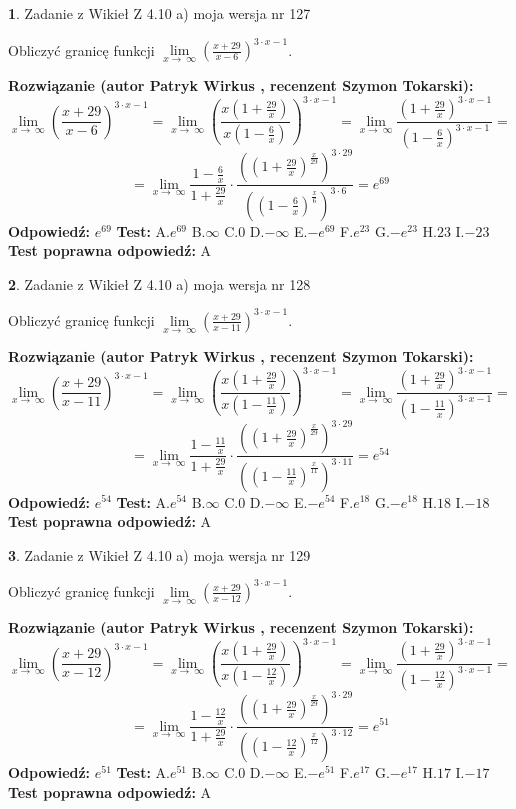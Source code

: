\documentclass[12pt, a4paper]{article}
\theoremstyle{definition} %
\newtheorem{zad}{}
\newcommand{\zadStart}[1]{\begin{zad}#1\newline}
\newcommand{\zadStop}{\end{zad}}
\newcommand{\rozwStart}[2]{\noindent \textbf{Rozwiązanie (autor #1 , recenzent #2): }\newline}
\newcommand{\rozwStop}{\newline}
\newcommand{\odpStart}{\noindent \textbf{Odpowiedź:}\newline}
\newcommand{\odpStop}{\newline}
\newcommand{\testStart}{\noindent \textbf{Test:}\newline}
\newcommand{\testStop}{\newline}
\newcommand{\kluczStart}{\noindent \textbf{Test poprawna odpowiedź:}\newline}
\newcommand{\kluczStop}{\newline}
\begin{document}
\zadStart{Zadanie z Wikieł Z 4.10 a) moja wersja nr 127}

Obliczyć granicę funkcji  $\lim\limits_{x\to\ \infty}(\frac{x+29}{x-6})^{3\cdot x-1}$.
\zadStop
\rozwStart{Patryk Wirkus}{Szymon Tokarski}
$$\lim\limits_{x\to\ \infty}(\frac{x+29}{x-6})^{3\cdot x-1} = \lim\limits_{x\to\ \infty}(\frac{x(1+\frac{29}{x})}{x(1-\frac{6}{x})})^{3\cdot x-1}=\lim\limits_{x\to\ \infty}\frac{(1+\frac{29}{x})^{3\cdot x-1}}{(1-\frac{6}{x})^{3\cdot x-1}}=$$
$$=\lim\limits_{x\to\ \infty}\frac{1-\frac{6}{x}}{1+\frac{29}{x}}\cdot\frac{((1+\frac{29}{x})^{\frac{x}{29}})^{3\cdot29}}{((1-\frac{6}{x})^{\frac{x}{6}})^{3\cdot6}}=e^{69}$$
\rozwStop
\odpStart
$e^{69}$
\odpStop
\testStart
A.$e^{69}$ B.$\infty$ C.$0$ D.$-\infty$ E.$-e^{69}$
F.$e^{23}$ G.$-e^{23}$
H.$23$
I.$-23$
\testStop
\kluczStart
A
\kluczStop



\zadStart{Zadanie z Wikieł Z 4.10 a) moja wersja nr 128}

Obliczyć granicę funkcji  $\lim\limits_{x\to\ \infty}(\frac{x+29}{x-11})^{3\cdot x-1}$.
\zadStop
\rozwStart{Patryk Wirkus}{Szymon Tokarski}
$$\lim\limits_{x\to\ \infty}(\frac{x+29}{x-11})^{3\cdot x-1} = \lim\limits_{x\to\ \infty}(\frac{x(1+\frac{29}{x})}{x(1-\frac{11}{x})})^{3\cdot x-1}=\lim\limits_{x\to\ \infty}\frac{(1+\frac{29}{x})^{3\cdot x-1}}{(1-\frac{11}{x})^{3\cdot x-1}}=$$
$$=\lim\limits_{x\to\ \infty}\frac{1-\frac{11}{x}}{1+\frac{29}{x}}\cdot\frac{((1+\frac{29}{x})^{\frac{x}{29}})^{3\cdot29}}{((1-\frac{11}{x})^{\frac{x}{11}})^{3\cdot11}}=e^{54}$$
\rozwStop
\odpStart
$e^{54}$
\odpStop
\testStart
A.$e^{54}$ B.$\infty$ C.$0$ D.$-\infty$ E.$-e^{54}$
F.$e^{18}$ G.$-e^{18}$
H.$18$
I.$-18$
\testStop
\kluczStart
A
\kluczStop



\zadStart{Zadanie z Wikieł Z 4.10 a) moja wersja nr 129}

Obliczyć granicę funkcji  $\lim\limits_{x\to\ \infty}(\frac{x+29}{x-12})^{3\cdot x-1}$.
\zadStop
\rozwStart{Patryk Wirkus}{Szymon Tokarski}
$$\lim\limits_{x\to\ \infty}(\frac{x+29}{x-12})^{3\cdot x-1} = \lim\limits_{x\to\ \infty}(\frac{x(1+\frac{29}{x})}{x(1-\frac{12}{x})})^{3\cdot x-1}=\lim\limits_{x\to\ \infty}\frac{(1+\frac{29}{x})^{3\cdot x-1}}{(1-\frac{12}{x})^{3\cdot x-1}}=$$
$$=\lim\limits_{x\to\ \infty}\frac{1-\frac{12}{x}}{1+\frac{29}{x}}\cdot\frac{((1+\frac{29}{x})^{\frac{x}{29}})^{3\cdot29}}{((1-\frac{12}{x})^{\frac{x}{12}})^{3\cdot12}}=e^{51}$$
\rozwStop
\odpStart
$e^{51}$
\odpStop
\testStart
A.$e^{51}$ B.$\infty$ C.$0$ D.$-\infty$ E.$-e^{51}$
F.$e^{17}$ G.$-e^{17}$
H.$17$
I.$-17$
\testStop
\kluczStart
A
\kluczStop
\end{document}

